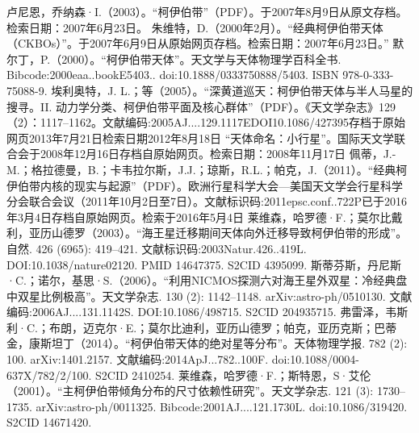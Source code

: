 \begin{enumerate}
 卢尼恩，乔纳森·I.（2003）。“柯伊伯带”（PDF）。于2007年8月9日从原文存档。检索日期：2007年6月23日。
 朱维特，D.（2000年2月）。“经典柯伊伯带天体（CKBOs）”。于2007年6月9日从原始网页存档。检索日期：2007年6月23日。”
 默尔丁，P.（2000）。“柯伊伯带天体”。天文学与天体物理学百科全书. Bibcode:2000eaa..bookE5403.. doi:10.1888/0333750888/5403. ISBN 978-0-333-75088-9.
 埃利奥特，J. L.；等（2005）。“深黄道巡天：柯伊伯带天体与半人马星的搜寻。II. 动力学分类、柯伊伯带平面及核心群体”（PDF）。《天文学杂志》129（2）：1117–1162。文献编码:2005AJ....129.1117EDOI10.1086/427395存档于原始网页2013年7月21日检索日期2012年8月18日
 “天体命名：小行星”。国际天文学联合会于2008年12月16日存档自原始网页。检索日期：2008年11月17日
 佩蒂，J.-M.；格拉德曼，B.；卡韦拉尔斯，J.J.；琼斯，R.L.；帕克，J.（2011）。“经典柯伊伯带内核的现实与起源”（PDF）。欧洲行星科学大会—美国天文学会行星科学分会联合会议（2011年10月2日至7日）。文献标识码:2011epsc.conf..722P已于2016年3月4日存档自原始网页。检索于2016年5月4日
 莱维森，哈罗德·F.；莫尔比戴利，亚历山德罗（2003）。“海王星迁移期间天体向外迁移导致柯伊伯带的形成”。自然. 426 (6965): 419–421. 文献标识码:2003Natur.426..419L. DOI:10.1038/nature02120. PMID 14647375. S2CID 4395099.
 斯蒂芬斯，丹尼斯·C.；诺尔，基思·S.（2006）。“利用NICMOS探测六对海王星外双星：冷经典盘中双星比例极高”。天文学杂志. 130 (2): 1142–1148. arXiv:astro-ph/0510130. 文献编码:2006AJ....131.1142S. DOI:10.1086/498715. S2CID 204935715.
 弗雷泽，韦斯利·C.；布朗，迈克尔·E.；莫尔比迪利，亚历山德罗；帕克，亚历克斯；巴蒂金，康斯坦丁（2014）。“柯伊伯带天体的绝对星等分布”。天体物理学报. 782 (2): 100. arXiv:1401.2157. 文献编码:2014ApJ...782..100F. doi:10.1088/0004-637X/782/2/100. S2CID 2410254.
 莱维森，哈罗德·F.；斯特恩，S·艾伦（2001）。“主柯伊伯带倾角分布的尺寸依赖性研究”。天文学杂志. 121 (3): 1730–1735. arXiv:astro-ph/0011325. Bibcode:2001AJ....121.1730L. doi:10.1086/319420. S2CID 14671420.
\end{enumerate}